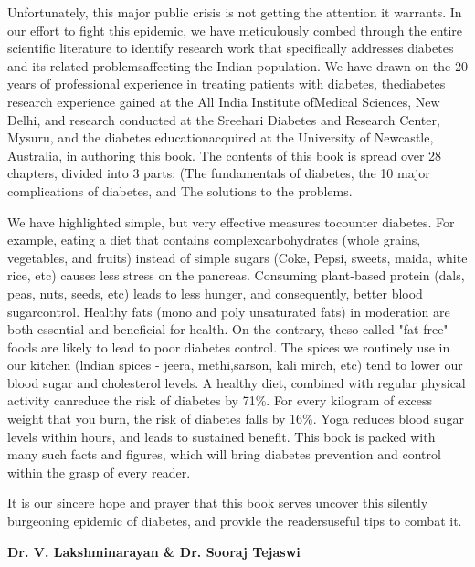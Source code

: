 Unfortunately, this major public crisis is not getting the attention it warrants. In our effort to fight this epidemic, we have meticulously combed through the entire scientific literature to identify research work that specifically addresses diabetes and its related problems\break affecting the Indian population. We have drawn on the 20 years of professional experience in treating patients with diabetes, the\break diabetes research experience gained at the All India Institute of\break Medical Sciences, New Delhi, and research conducted at the Sreehari Diabetes and Research Center, Mysuru, and the diabetes education\break acquired at the University of Newcastle, Australia, in authoring this book. The contents of this book is spread over 28 chapters, divided into 3 parts: (The fundamentals of diabetes, the 10 major complications of diabetes, and The solutions to the problems.

We have highlighted simple, but very effective measures to\break counter diabetes. For example, eating a diet that contains complex\break carbohydrates (whole grains, vegetables, and fruits) instead of simple sugars (Coke, Pepsi, sweets, maida, white rice, etc) causes less stress on the pancreas. Consuming plant-based protein (dals, peas, nuts, seeds, etc) leads to less hunger, and consequently, better blood sugar\break control. Healthy fats (mono and poly unsaturated fats) in moderation are both essential and beneficial for health. On the contrary, the\break so-called "fat free" foods are likely to lead to poor diabetes control. The spices we routinely use in our kitchen (lndian spices - jeera, methi,\break sarson, kali mirch, etc) tend to lower our blood sugar and cholesterol levels. A healthy diet, combined with regular physical activity can\break reduce the risk of diabetes by 71\%. For every kilogram of excess weight that you burn, the risk of diabetes falls by 16\%. Yoga reduces blood sugar levels within hours, and leads to sustained benefit. This book is packed with many such facts and figures, which will bring diabetes prevention and control within the grasp of every reader.

It is our sincere hope and prayer that this book serves uncover this silently burgeoning epidemic of diabetes, and provide the readers\break useful tips to combat it.

\begin{flushright}
\textbf{Dr. V. Lakshminarayan \& Dr. Sooraj Tejaswi}
\end{flushright}


\newpage
~\phantom{a}
\thispagestyle{empty}
\newpage
